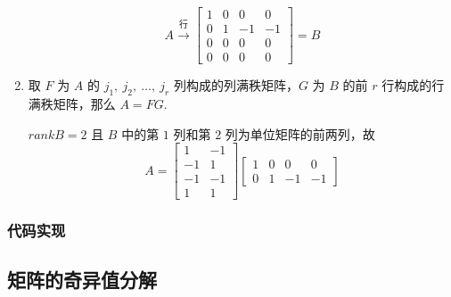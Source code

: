 \begin{solution}
\begin{enumerate}
\begin{equation*}
                            A \stackrel{\text{行}}{\longrightarrow} \begin{bmatrix}
                                1 & 0 & 0 & 0 \\ 0 & 1 & -1 & -1 \\ 0 & 0 & 0 & 0 \\ 0 & 0 & 0 & 0
                            \end{bmatrix} = B
                        \end{equation*}
                    \item 取 $F$ 为 $A$ 的 $j_1, \ j_2, \ \dots, \ j_r$ 列构成的列满秩矩阵，$G$ 为 $B$ 的前 $r$ 行构成的行满秩矩阵，那么 $A = FG$.
                        \par $rankB = 2$ 且 $B$ 中的第 $1$ 列和第 $2$ 列为单位矩阵的前两列，故
                        \begin{equation*}
                            A = \begin{bmatrix}
                                1 & -1 \\ -1 & 1 \\ -1 & -1 \\ 1 & 1
                            \end{bmatrix}\begin{bmatrix}
                                1 & 0 & 0 & 0 \\ 0 & 1 & -1 & -1
                            \end{bmatrix}
                        \end{equation*}
                \end{enumerate}
            \end{solution}

        \subsubsection{代码实现}
            

    \subsection{矩阵的奇异值分解}
